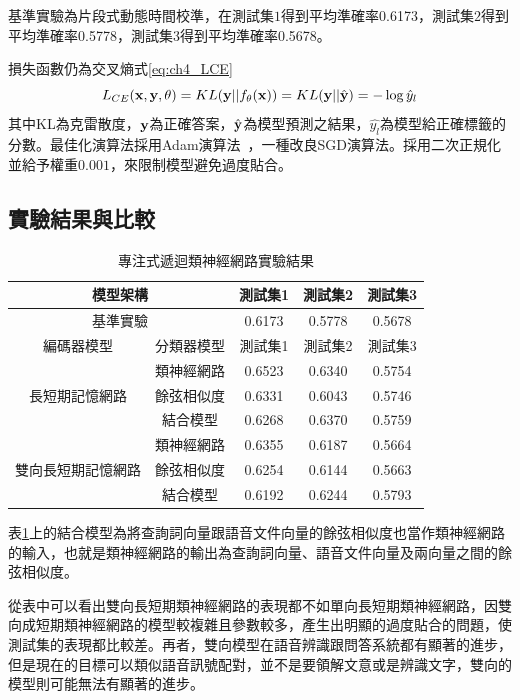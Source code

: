 基準實驗為片段式動態時間校準，在測試集$1$得到平均準確率0.6173，測試集$2$得到平均準確率0.5778，測試集$3$得到平均準確率0.5678。

損失函數仍為交叉熵式\ref{eq:ch4_LCE}
\begin{equation}
\label{eq:ch4_LCE}
L_{CE}(\bold{x}, \bold{y} , \theta) = KL(\bold{y} || f_{\theta}(\bold{x}))= KL( \bold{y} ||\hat{\bold {y}} )  = - \log \hat{y}_{l} 
\end{equation}
其中KL為克雷散度，$\bold{y}$為正確答案，$\hat{\bold{y}}$為模型預測之結果，$\hat{y_l}$為模型給正確標籤的分數。最佳化演算法採用Adam演算法~\cite{kingma2014adam}，一種改良SGD演算法。採用二次正規化並給予權重$0.001$，來限制模型避免過度貼合。
\subsection{實驗結果與比較}
\begin{table}[ht]
	 \centering
	 \caption{專注式遞迴類神經網路實驗結果}
	 \label{table:ch4_att_exp}
	 \begin{tabular}{|c|c|c|c|c|}
		 \hline
		 \multicolumn{2}{|c|}{模型架構} & 測試集1 & 測試集2 & 測試集3 \\
		 \hline
		 \multicolumn{2}{|c|}{基準實驗} & 0.6173 & 0.5778 & 0.5678\\
		 \hline
		 \hline 
		 編碼器模型 & 分類器模型 & 測試集1 &測試集2 & 測試集3 \\
		 \hline
		 \multirow{3}{*}{長短期記憶網路} & 類神經網路 &
		 {\color{red}0.6523} &0.6340 & 0.5754\\
		 \cline{2-5}
		 & 餘弦相似度& 0.6331 & 0.6043 & 0.5746 \\
		 \cline{2-5}
		 & 結合模型 & 0.6268 & 0.6370 & 0.5759 \\ 
		 \hline
		 \multirow{3}{*}{雙向長短期記憶網路} & 類神經網路 &
		 0.6355 & 0.6187 & 0.5664\\
		 \cline{2-5}
		 & 餘弦相似度& 0.6254 & 0.6144&0.5663\\
		 \cline{2-5}
		 & 結合模型 &0.6192&0.6244&0.5793 \\
		 \hline
	   \end{tabular}
\end{table}


表\ref{table:ch4_att_exp}上的結合模型為將查詢詞向量跟語音文件向量的餘弦相似度也當作類神經網路的輸入，也就是類神經網路的輸出為查詢詞向量、語音文件向量及兩向量之間的餘弦相似度。

從表中可以看出雙向長短期類神經網路的表現都不如單向長短期類神經網路，因雙向成短期類神經網路的模型較複雜且參數較多，產生出明顯的過度貼合的問題，使測試集的表現都比較差。再者，雙向模型在語音辨識跟問答系統都有顯著的進步，但是現在的目標可以類似語音訊號配對，並不是要領解文意或是辨識文字，雙向的模型則可能無法有顯著的進步。


